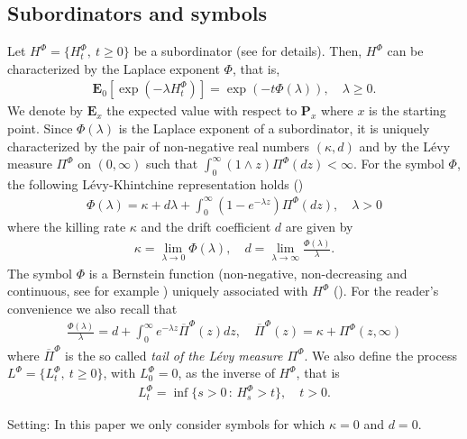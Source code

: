 \documentclass[11pt,a4paper]{article}
\theoremstyle{plain}
\theoremstyle{definition}
\theoremstyle{remark}
\begin{document}
	\subsection{Subordinators and symbols}
	Let $H^\Phi =\{H_t^\Phi , \ t \geq 0\}$ be a subordinator (see \cite{bertoin1999subordinators} for details). Then, $H^\Phi$ can be
	characterized by the Laplace exponent $\Phi$, that is,
	\begin{align}
		\label{LapH}
		\mathbf{E}_0[\exp(-\lambda H_t^\Phi)]=\exp(-t\Phi(\lambda)), \quad \lambda \geq 0.
	\end{align}
	We denote by $\mathbf{E}_x$ the expected value with respect to $\mathbf{P}_x$ where $x$ is the starting point. Since $\Phi(\lambda)$ is the Laplace exponent of a subordinator, it is uniquely characterized by the pair of non-negative real numbers $(\kappa,d)$  and by the L\'evy measure $\Pi^\Phi$ on $(0,\infty)$ such that $\int_0^\infty (1 \wedge z) \Pi^\Phi(dz) < \infty$.
	For the symbol $\Phi$, the following L\'evy-Khintchine representation holds (\cite[Theorem 3.2]{schilling2012bernstein})
	\begin{align}
		\label{LevKinFormula}
		\Phi(\lambda)=\kappa+d \lambda + \int_0^\infty (1-e^{-\lambda z}) \Pi^\Phi(dz), \quad \lambda>0
	\end{align}
	where the killing rate $\kappa$ and the drift coefficient $d$ are given by
	\begin{align*}
		\kappa=\lim_{\lambda \to 0} \Phi(\lambda), \quad d=\lim_{\lambda \to \infty} \frac{\Phi(\lambda)}{\lambda}.
	\end{align*}
	The symbol  $\Phi$ is a Bernstein function (non-negative, non-decreasing and continuous, see for example \cite{schilling2012bernstein}) uniquely associated with $H^\Phi$ (\cite[Theorem 5.2]{schilling2012bernstein}). For the reader's convenience we also recall that
	\begin{align}
		\label{tailSymb}
		\frac{\Phi(\lambda)}{\lambda}=d+ \int_0^\infty e^{-\lambda z} \overline{\Pi}^\Phi(z) dz, \quad \overline{\Pi}^\Phi(z)=\kappa+\Pi^\Phi(z,\infty)
	\end{align}
	where $\overline{\Pi}^\Phi$ is the so called \textit{tail of the L\'evy measure $\Pi^\Phi$}. We also define the process $L^\Phi=\{L_t^\Phi,\ t \geq 0\}$, with $L_0^\Phi=0$,  as the inverse of $H^\Phi$, that is
	\begin{align*}
		L_t^\Phi = \inf \{s > 0\,:\, H_s^\Phi >t \}, \quad t>0.
	\end{align*}
	
	{\sc Setting: } In this paper we only consider symbols for which $\kappa=0$ and $d=0$. \\
	
\end{document}
